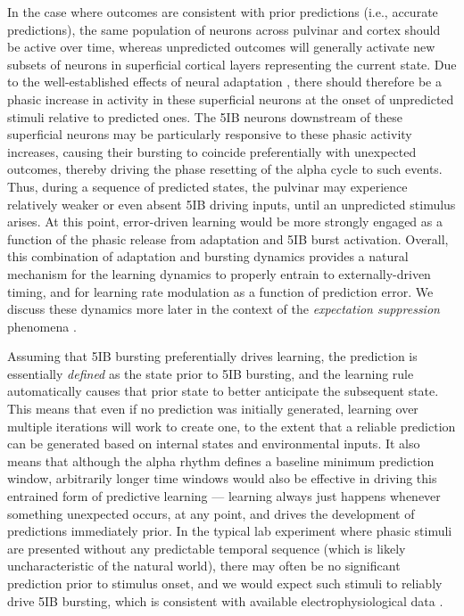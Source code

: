 \documentclass[11pt,twoside]{article}
\newif\myifpdf
\begin{document}
In the case where outcomes are consistent with prior predictions (i.e., accurate predictions), the same population of neurons across pulvinar and cortex should be active over time, whereas unpredicted outcomes will generally activate new subsets of neurons in superficial cortical layers representing the current state.  Due to the well-established effects of neural adaptation \citep{MullerMethaKrauskopfEtAl99,AbbottVarelaSenEtAl97,BretteGerstner05,Grill-SpectorHensonMartin06,Hennig13}, there should therefore be a phasic increase in activity in these superficial neurons at the onset of unpredicted stimuli relative to predicted ones.  The 5IB neurons downstream of these superficial neurons may be particularly responsive to these phasic activity increases, causing their bursting to coincide preferentially with unexpected outcomes, thereby driving the phase resetting of the alpha cycle to such events.  Thus, during a sequence of predicted states, the pulvinar may experience relatively weaker or even absent 5IB driving inputs, until an unpredicted stimulus arises.  At this point, error-driven learning would be more strongly engaged as a function of the phasic release from adaptation and 5IB burst activation.  Overall, this combination of adaptation and bursting dynamics provides a natural mechanism for the learning dynamics to properly entrain to externally-driven timing, and for learning rate modulation as a function of prediction error.  We discuss these dynamics more later in the context of the \emph{expectation suppression} phenomena \citep{SummerfieldTrittschuhMontiEtAl08,TodorovicEdeMarisEtAl11,MeyerOlson11,BastosUsreyAdamsEtAl12}.

Assuming that 5IB bursting preferentially drives learning, the prediction is essentially \emph{defined} as the state prior to 5IB bursting, and the learning rule automatically causes that prior state to better anticipate the subsequent state.  This means that even if no prediction was initially generated, learning over multiple iterations will work to create one, to the extent that a reliable prediction can be generated based on internal states and environmental inputs.  It also means that although the alpha rhythm defines a baseline minimum prediction window, arbitrarily longer time windows would also be effective in driving this entrained form of predictive learning --- learning always just happens whenever something unexpected occurs, at any point, and drives the development of predictions immediately prior.  In the typical lab experiment where phasic stimuli are presented without any predictable temporal sequence (which is likely uncharacteristic of the natural world), there may often be no significant prediction prior to stimulus onset, and we would expect such stimuli to reliably drive 5IB bursting, which is consistent with available electrophysiological data \citep{Bender82,PetersenRobinsonKeys85,BenderYouakim01,Robinson93,SaalmannPinskWangEtAl12,KomuraNikkuniHirashimaEtAl13,ZhouSchaferDesimone16}.
\end{document}

